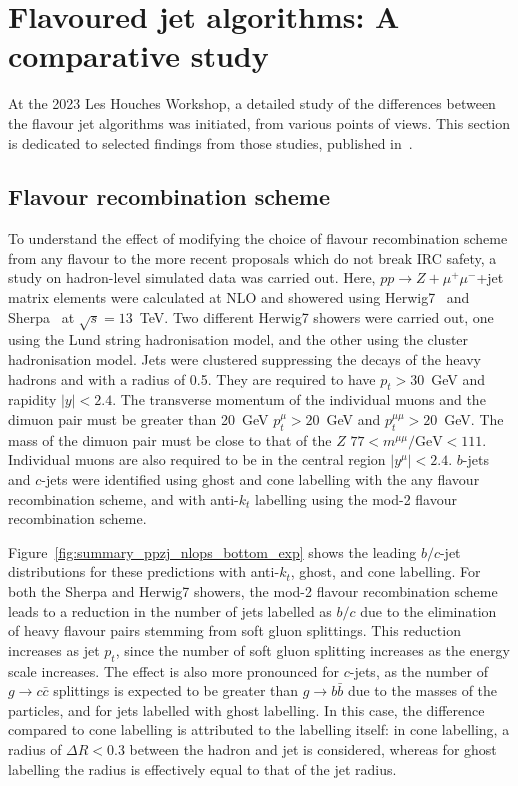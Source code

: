 \documentclass[10pt,a4paper]{book}
\begin{document}
\section{Flavoured jet algorithms: A comparative study}

At the 2023 Les Houches Workshop, a detailed study of the differences between the flavour jet algorithms was initiated, from various points of views. This section is dedicated to selected findings from those studies, published in~\cite{Behring:2025ilo}.

\subsection{Flavour recombination scheme}
\label{flav recomb}
To understand the effect of modifying the choice of flavour recombination scheme from any flavour to the more recent proposals which do not break IRC safety, a study on hadron-level simulated data was carried out. Here, $pp \rightarrow Z+\mu^+\mu^-$+jet matrix elements were calculated at NLO and showered using Herwig7~\cite{Bellm:2015jjp} and Sherpa~\cite{Sherpa:2024mfk} at $\sqrt{s} = 13$~TeV. Two different Herwig7 showers were carried out, one using the Lund string hadronisation model, and the other using the cluster hadronisation model. Jets were clustered suppressing the decays of the heavy hadrons and with a radius of 0.5. They are required to have $p_t > 30$~GeV and rapidity $\vert y \vert < 2.4$. The transverse momentum of the individual muons and the dimuon pair must be greater than 20~GeV $p_t^\mu > 20$~GeV and $p_t^{\mu\mu} > 20$~GeV. The mass of the dimuon pair must be close to that of the $Z$ $77 < m^{\mu\mu}/\text{GeV} < 111$. Individual muons are also required to be in the central region $\vert y^\mu \vert < 2.4$. $b$-jets and $c$-jets were identified using ghost and cone labelling with the any flavour recombination scheme, and with anti-$k_t$ labelling using the mod-2 flavour recombination scheme.

Figure~\ref{fig:summary_ppzj_nlops_bottom_exp} shows the leading $b/c$-jet distributions for these predictions with anti-$k_t$, ghost, and cone labelling. For both the Sherpa and Herwig7 showers, the mod-2 flavour recombination scheme leads to a reduction in the number of jets labelled as $b/c$ due to the elimination of heavy flavour pairs stemming from soft gluon splittings. This reduction increases as jet $p_t$, since the number of soft gluon splitting increases as the energy scale increases. The effect is also more pronounced for $c$-jets, as the number of $g\rightarrow c\bar{c}$ splittings is expected to be greater than $g\rightarrow b\bar{b}$ due to the masses of the particles, and for jets labelled with ghost labelling. In this case, the difference compared to cone labelling is attributed to the labelling itself: in cone labelling, a radius of $\Delta R < 0.3$ between the hadron and jet is considered, whereas for ghost labelling the radius is effectively equal to that of the jet radius.
\end{document}
